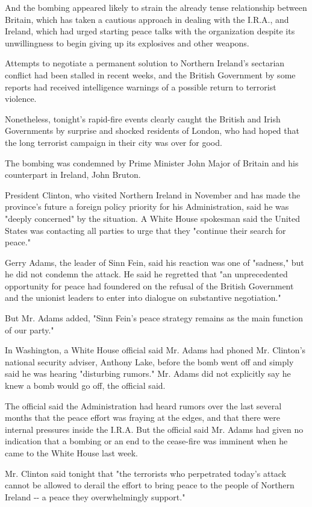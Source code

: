 And the bombing appeared likely to strain the already tense relationship
between Britain, which has taken a cautious approach in dealing with the
I.R.A., and Ireland, which had urged starting peace talks with the
organization despite its unwillingness to begin giving up its explosives
and other weapons.

Attempts to negotiate a permanent solution to Northern Ireland's
sectarian conflict had been stalled in recent weeks, and the British
Government by some reports had received intelligence warnings of a
possible return to terrorist violence.

Nonetheless, tonight's rapid-fire events clearly caught the British and
Irish Governments by surprise and shocked residents of London, who had
hoped that the long terrorist campaign in their city was over for good.

The bombing was condemned by Prime Minister John Major of Britain and
his counterpart in Ireland, John Bruton.

President Clinton, who visited Northern Ireland in November and has made
the province's future a foreign policy priority for his Administration,
said he was "deeply concerned" by the situation. A White House spokesman
said the United States was contacting all parties to urge that they
"continue their search for peace."

Gerry Adams, the leader of Sinn Fein, said his reaction was one of
"sadness," but he did not condemn the attack. He said he regretted that
"an unprecedented opportunity for peace had foundered on the refusal of
the British Government and the unionist leaders to enter into dialogue
on substantive negotiation."

But Mr. Adams added, "Sinn Fein's peace strategy remains as the main
function of our party."

In Washington, a White House official said Mr. Adams had phoned Mr.
Clinton's national security adviser, Anthony Lake, before the bomb went
off and simply said he was hearing "disturbing rumors." Mr. Adams did
not explicitly say he knew a bomb would go off, the official said.

The official said the Administration had heard rumors over the last
several months that the peace effort was fraying at the edges, and that
there were internal pressures inside the I.R.A. But the official said
Mr. Adams had given no indication that a bombing or an end to the
cease-fire was imminent when he came to the White House last week.

Mr. Clinton said tonight that "the terrorists who perpetrated today's
attack cannot be allowed to derail the effort to bring peace to the
people of Northern Ireland -\/- a peace they overwhelmingly support."

